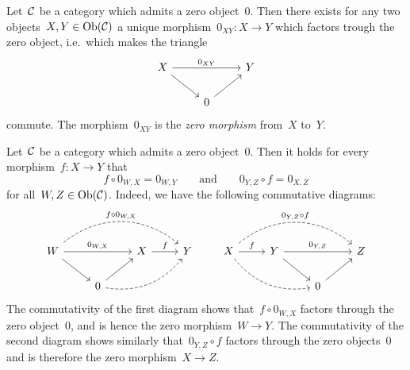 \begin{remarkdefinition}
  Let~$\mathcal{C}$ be a category which admits a zero object~$0$.
  Then there exists for any two objects~$X, Y \in \operatorname{Ob}(\mathcal{C})$ a unique morphism~$0_{XY} \colon X \to Y$ which factors trough the zero object, i.e.\ which makes the triangle
  \[
    \begin{tikzcd}
        X
        \arrow{dr}
        \arrow{rr}[above]{0_{XY}}
      & {}
      & Y
      \\
        {}
      & 0
        \arrow{ur}
      & {}
    \end{tikzcd}
  \]
  commute.
  The morphism~$0_{XY}$ is the \emph{zero morphism} from~$X$ to~$Y$.
\end{remarkdefinition}


\begin{remark*}
  Let~$\mathcal{C}$ be a category which admits a zero object~$0$.
  Then it holds for every morphism~$f \colon X \to Y$ that
  \[
      f \circ 0_{W,X}
    = 0_{W,Y}
    \qquad\text{and}\qquad
      0_{Y,Z} \circ f
    = 0_{X,Z}
  \]
  for all~$W, Z \in \operatorname{Ob}(\mathcal{C})$.
  Indeed, we have the following commutative diagrams:
  \[
    \begin{tikzcd}
        W
        \arrow[dashed, bend left = 40]{rrr}[above]{f \circ 0_{W,X}}
        \arrow{rr}[above]{0_{W,X}}
        \arrow{dr}
      & {}
      & X
        \arrow{r}[above]{f}
      & Y
      \\
        {}
      & 0
        \arrow{ur}
        \arrow[dashed, bend right]{urr}
      & {}
      & {}
    \end{tikzcd}
    \qquad
    \begin{tikzcd}
        X
        \arrow[dashed, bend left = 40]{rrr}[above]{0_{Y,Z} \circ f}
        \arrow{r}[above]{f}
        \arrow[dashed, bend right]{drr}
      & Y
        \arrow{rr}[above]{0_{Y,Z}}
        \arrow{dr}
      & {}
      & Z
      \\
        {}
      & {}
      & 0
        \arrow{ur}
      & {}
    \end{tikzcd}
  \]
  The commutativity of the first diagram shows that~$f \circ 0_{W,X}$ factors through the zero object~$0$, and is hence the zero morphism~$W \to Y$.
  The commutativity of the second diagram shows similarly that~$0_{Y,Z} \circ f$ factors through the zero objects~$0$ and is therefore the zero morphism~$X \to Z$.
\end{remark*}









